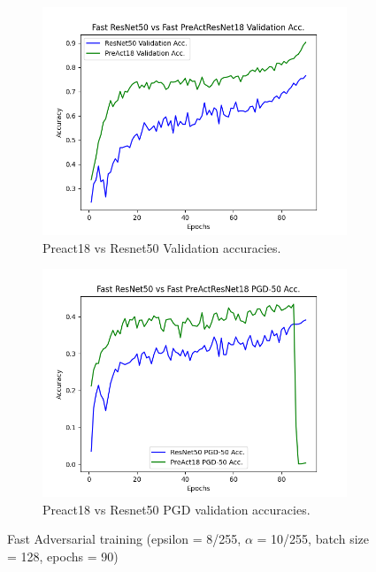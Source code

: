 \documentclass{article}
\begin{document}
\begin{figure}[hbt!]
  \centering
  \begin{subfigure}[b]{0.4\linewidth}
    \includegraphics[width=\linewidth]{images/fastComp/Figure_1.png}
    \caption{ Preact18 vs Resnet50 Validation accuracies.}
  \end{subfigure}
  \begin{subfigure}[b]{0.4\linewidth}
    \includegraphics[width=\linewidth]{images/fastComp/Figure_2.png}
    \caption{Preact18 vs Resnet50 PGD validation accuracies.}
  \end{subfigure}
  \caption{Fast Adversarial training (epsilon = 8/255, $\alpha$ = 10/255, batch size = 128,  epochs = 90)}
  \label{fig:coffee}
\end{figure}
\end{document}
